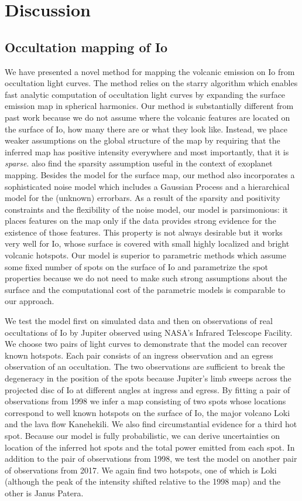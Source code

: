 \documentclass[modern]{aastex62}
\begin{document}
\section{Discussion}
\label{sec:discussion}
\subsection{Occultation mapping of Io}
We have presented a novel method for mapping the volcanic emission on Io from occultation light curves.
The method relies on the \textsf{starry} algorithm which enables fast analytic computation of occultation light curves by expanding the surface emission map in spherical harmonics.
Our method is substantially different from past work because we do not assume where the volcanic features are located on the surface of Io, how many there are or what they look like.
Instead, we place weaker assumptions on the global structure of the map by requiring that the inferred map has positive intensity everywhere and most importantly, that it is \emph{sparse}.
\cite{aizawa2020} also find the sparsity assumption useful in the context of exoplanet mapping.
Besides the model for the surface map, our method also incorporates a sophisticated noise model which includes a Gaussian Process and a hierarchical model for the (unknown) errorbars.
As a result of the sparsity and positivity constraints and the flexibility of the noise model,
our model is parsimonious: it places features on the map only if the data provides strong evidence for the existence of those features.
This property is not always desirable but it works very well for Io, whose surface is covered with small highly localized and bright volcanic hotspots.
Our model is superior to parametric methods which assume some fixed number of spots on the surface of Io and parametrize the spot properties because we do not need to make such strong assumptions about the surface and the computational cost of the parametric models is comparable to our approach.

We test the model first on simulated data and then on observations of real occultations of Io by Jupiter observed using NASA's Infrared Telescope Facility.
We choose two pairs of light curves to demonstrate that the model can recover known hotspots.
Each pair consists of an ingress observation and an egress observation of an occultation. 
The two observations are sufficient to break the degeneracy in the position of the spots because Jupiter's limb sweeps across the projected disc of Io at different angles at ingress and egress.
By fitting a pair of observations from 1998 we infer a map consisting of two spots whose locations correspond to well known hotspots on the surface of Io, the major volcano Loki and the lava flow Kanehekili.
We also find circumstantial evidence for a third hot spot.
Because our model is fully probabilistic, we can derive uncertainties on location of the inferred hot spots and the total power emitted from each spot.
In addition to the pair of observations from 1998, we test the model on another pair of observations from 2017.
We again find two hotspots, one of which is Loki (although the peak of the intensity shifted relative to the 1998 map) and the other is Janus Patera.
\end{document}
